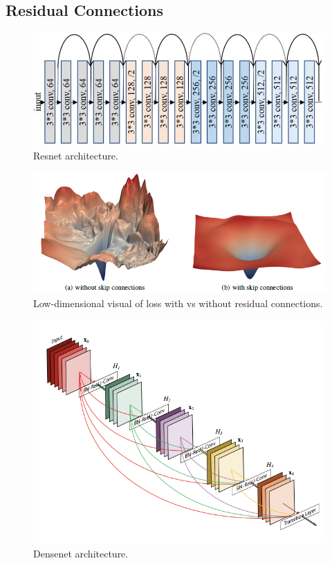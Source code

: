   \subsection{Residual Connections} 

    \begin{figure}[H]
      \centering 
      \includegraphics[scale=0.4]{img/02_Control/resnet_arch.png}
      \caption{Resnet architecture. } 
      \label{fig:resnet_arch}
    \end{figure}

    \begin{figure}[H]
      \centering 
      \includegraphics[scale=0.4]{img/02_Control/resnet_loss.png}
      \caption{Low-dimensional visual of loss with vs without residual connections. } 
      \label{fig:resnet_loss}
    \end{figure}

    \begin{figure}[H]
      \centering 
      \includegraphics[scale=0.4]{img/02_Control/densenet.png}
      \caption{Densenet architecture. } 
      \label{fig:densenet_architecture}
    \end{figure}

